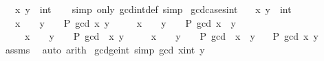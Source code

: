 \begin{isabellebody}
\ \ \ x\ y\ {\isacharcolon}{\kern0pt}{\isacharcolon}{\kern0pt}\ int\isanewline
%
\isadelimproof
\ \ %
\endisadelimproof
%
\isatagproof
{}\isamarkupfalse%
\ {\isacharparenleft}{\kern0pt}simp\ only{\isacharcolon}{\kern0pt}\ gcd{\isacharunderscore}{\kern0pt}int{\isacharunderscore}{\kern0pt}def{\isacharparenright}{\kern0pt}\ simp%
\endisatagproof
{\isafoldproof}%
%
\isadelimproof
\isanewline
%
\endisadelimproof
\isanewline
{}\isamarkupfalse%
\ gcd{\isacharunderscore}{\kern0pt}cases{\isacharunderscore}{\kern0pt}int{\isacharcolon}{\kern0pt}\isanewline
\ \ \ x\ y\ {\isacharcolon}{\kern0pt}{\isacharcolon}{\kern0pt}\ int\isanewline
\ \ \ {\isachardoublequoteopen}x\ {\isasymge}\ {}\ {\isasymLongrightarrow}\ y\ {\isasymge}\ {}\ {\isasymLongrightarrow}\ P\ {\isacharparenleft}{\kern0pt}gcd\ x\ y{\isacharparenright}{\kern0pt}{\isachardoublequoteclose}\isanewline
\ \ \ \ \ {\isachardoublequoteopen}x\ {\isasymge}\ {}\ {\isasymLongrightarrow}\ y\ {\isasymle}\ {}\ {\isasymLongrightarrow}\ P\ {\isacharparenleft}{\kern0pt}gcd\ x\ {\isacharparenleft}{\kern0pt}{\isacharminus}{\kern0pt}\ y{\isacharparenright}{\kern0pt}{\isacharparenright}{\kern0pt}{\isachardoublequoteclose}\isanewline
\ \ \ \ \ {\isachardoublequoteopen}x\ {\isasymle}\ {}\ {\isasymLongrightarrow}\ y\ {\isasymge}\ {}\ {\isasymLongrightarrow}\ P\ {\isacharparenleft}{\kern0pt}gcd\ {\isacharparenleft}{\kern0pt}{\isacharminus}{\kern0pt}\ x{\isacharparenright}{\kern0pt}\ y{\isacharparenright}{\kern0pt}{\isachardoublequoteclose}\isanewline
\ \ \ \ \ {\isachardoublequoteopen}x\ {\isasymle}\ {}\ {\isasymLongrightarrow}\ y\ {\isasymle}\ {}\ {\isasymLongrightarrow}\ P\ {\isacharparenleft}{\kern0pt}gcd\ {\isacharparenleft}{\kern0pt}{\isacharminus}{\kern0pt}\ x{\isacharparenright}{\kern0pt}\ {\isacharparenleft}{\kern0pt}{\isacharminus}{\kern0pt}\ y{\isacharparenright}{\kern0pt}{\isacharparenright}{\kern0pt}{\isachardoublequoteclose}\isanewline
\ \ \ {\isachardoublequoteopen}P\ {\isacharparenleft}{\kern0pt}gcd\ x\ y{\isacharparenright}{\kern0pt}{\isachardoublequoteclose}\isanewline
%
\isadelimproof
\ \ %
\endisadelimproof
%
\isatagproof
{}\isamarkupfalse%
\ assms\ \isamarkupfalse%
\ auto\ arith%
\endisatagproof
{\isafoldproof}%
%
\isadelimproof
\isanewline
%
\endisadelimproof
\isanewline
{}\isamarkupfalse%
\ gcd{\isacharunderscore}{\kern0pt}ge{\isacharunderscore}{\kern0pt}{}{\isacharunderscore}{\kern0pt}int\ {\isacharbrackleft}{\kern0pt}simp{\isacharbrackright}{\kern0pt}{\isacharcolon}{\kern0pt}\ {\isachardoublequoteopen}gcd\ {\isacharparenleft}{\kern0pt}x{\isacharcolon}{\kern0pt}{\isacharcolon}{\kern0pt}int{\isacharparenright}{\kern0pt}\ y\ {\isachargreater}{\kern0pt}{\isacharequal}{\kern0pt}\ {}{\isachardoublequoteclose}\isanewline

\end{isabellebody}
